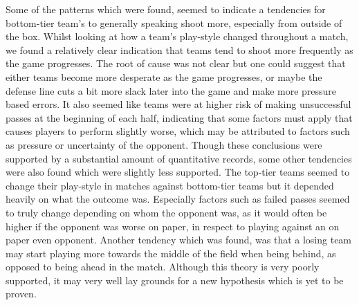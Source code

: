 \documentclass[11pt]{article}
\begin{document}
 



Some of the patterns which were found, seemed to indicate a tendencies for bottom-tier team's to generally speaking shoot more, especially from outside of the box. Whilst looking at how a team's play-style changed throughout a match, we found a relatively clear indication that teams tend to shoot more frequently as the game progresses. The root of cause was not clear but one could suggest that either teams become more desperate as the game progresses, or maybe the defense line cuts a bit more slack later into the game and make more pressure based errors. It also seemed like teams were at higher risk of making unsuccessful passes at the beginning of each half, indicating that some factors must apply that causes players to perform slightly worse, which may be attributed to factors such as pressure or uncertainty of the opponent. Though these conclusions were supported by a substantial amount of quantitative records, some other tendencies were also found which were slightly less supported. The top-tier teams seemed to change their play-style in matches against bottom-tier teams but it depended heavily on what the outcome was. Especially factors such as failed passes seemed to truly change depending on whom the opponent was, as it would often be higher if the opponent was worse on paper, in respect to playing against an on paper even opponent. Another tendency which was found, was that a losing team may start playing more towards the middle of the field when being behind, as opposed to being ahead in the match. Although this theory is very poorly supported, it may very well lay grounds for a new hypothesis which is yet to be proven.
\end{document}
